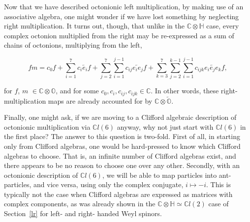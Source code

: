 \documentclass[letterpaper,12pt,titlepage,oneside,final]{book}
\newcommand{\CH}{\mathbb{C}\otimes\mathbb{H}}
\newcommand{\CO}{\mathbb{C}\otimes\mathbb{O}}
\newcommand{\COOO}{\mathbb{C}\otimes\overleftarrow{\mathbb{O}}}
\newcommand{\CLsix}{\mathbb{C}l(6)}
\newcommand{\CLtwo}{\mathbb{C}l(2)}
\begin{document}
\newpage

Now that we have described octonionic left multiplication, by making use of an associative algebra, one might wonder if we have lost something by neglecting right multiplication.  It turns out, though, that unlike in the $\CH$ case, every complex octonion multiplied from the right may be re-expressed as a sum of chains of octonions, multiplying from the left,

\begin{equation}\label{COOOgen}
fm = c_0f  + \sum_{i=1}^7 c_i \overleftarrow{e_i}f + \sum_{j=2}^7\sum_{i=1}^{j-1}c_{ij} \overleftarrow{e_{i}e_{j}}f + \sum_{k=3}^7\sum_{j=2}^{k-1}\sum_{i=1}^{j-1}c_{ijk} \overleftarrow{e_{i}e_{j}e_{k}}f,
\end{equation}

\noindent for $f$, $m$ $\in\CO$, and  for some $c_0, c_i,  c_{ij}, c_{ijk} \in \mathbb{C}$.  In other words,  these right-multiplication maps are already accounted for by $\COOO$.




Finally, one might ask, if we are moving to a Clifford algebraic description of octonionic multiplication via $\CLsix$ anyway, why not just start with $\CLsix$ in the first place?  The answer to this question is two-fold.  First of all, in starting only from Clifford algebras, one would be hard-pressed to know which Clifford algebras to choose.  That is, an infinite number of Clifford algebras exist, and there appears to be no reason to choose one over any other.  Secondly, with an octonionic description of $\CLsix$, we will be able to map particles into ant-particles, and vice versa, using only the complex conjugate, $i\mapsto -i$.  This is typically not the case when Clifford algebras are expressed as matrices with complex components, as was already shown in the $\CH \simeq \CLtwo$ case of Section~\ref{lr} for left- and right- handed Weyl spinors.
\end{document}
